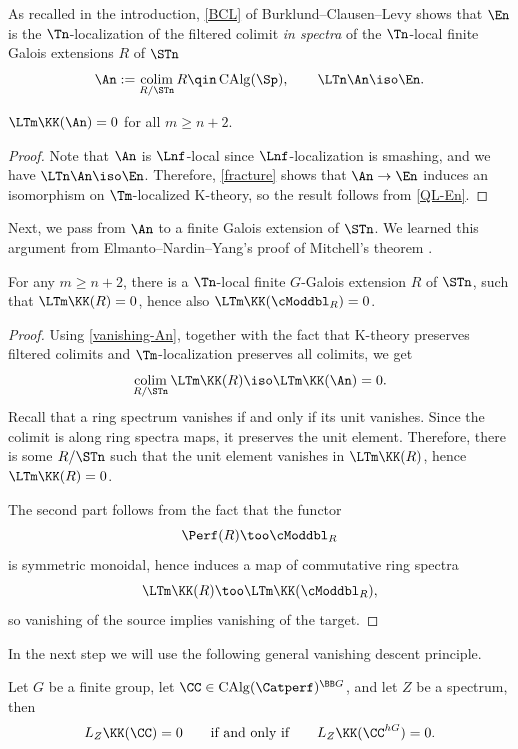 As recalled in the introduction, \cref{BCL} of Burklund--Clausen--Levy shows that $\En$ is the $\Tn$-localization of the filtered colimit \emph{in spectra} of the $\Tn$-local finite Galois extensions $R$ of $\STn$
\[
	\An := \colim_{R/\STn} R
	\qin \CAlg(\Sp),
	\qquad \LTn \An \iso \En.
\]

\begin{prop}\label{vanishing-An}
	$\LTm \KK(\An) = 0$ for all $m \geq n{+}2$.
\end{prop}

\begin{proof}
	Note that $\An$ is $\Lnf$-local since $\Lnf$-localization is smashing, and we have $\LTn\An \iso \En$.
	Therefore, \cref{fracture} shows that $\An \to \En$ induces an isomorphism on $\Tm$-localized K-theory, so the result follows from \cref{QL-En}.
\end{proof}

Next, we pass from $\An$ to a finite Galois extension of $\STn$.
We learned this argument from Elmanto--Nardin--Yang's proof of Mitchell's theorem \cite{ENY}.

\begin{prop}\label{some-vanishing}
	For any $m \geq n{+}2$, there is a $\Tn$-local finite $G$-Galois extension $R$ of $\STn$, such that $\LTm \KK(R) = 0$, hence also $\LTm \KK(\cModdbl_R) = 0$.
\end{prop}

\begin{proof}
	Using \cref{vanishing-An}, together with the fact that K-theory preserves filtered colimits and $\Tm$-localization preserves all colimits, we get
	\[
		\colim_{R/\STn} \LTm\KK(R) \iso \LTm\KK(\An) = 0.
	\]
	Recall that a ring spectrum vanishes if and only if its unit vanishes.
	Since the colimit is along ring spectra maps, it preserves the unit element.
	Therefore, there is some $R/\STn$ such that the unit element vanishes in $\LTm\KK(R)$, hence $\LTm\KK(R) = 0$.

	The second part follows from the fact that the functor
	\[
		\Perf(R) \too \cModdbl_R
	\]
	is symmetric monoidal, hence induces a map of commutative ring spectra
	\[
		\LTm \KK(R) \too \LTm \KK(\cModdbl_R),
	\]
	so vanishing of the source implies vanishing of the target.
\end{proof}

In the next step we will use the following general vanishing descent principle.

\begin{prop}\label{descent}
	Let $G$ be a finite group, let $\CC \in \CAlg(\Catperf)^{\BB G}$, and let $Z$ be a spectrum, then
	\[
		L_Z \KK(\CC) = 0
		\qquad\text{if and only if}\qquad L_Z \KK(\CC^{hG}) = 0.
	\]
\end{prop}

